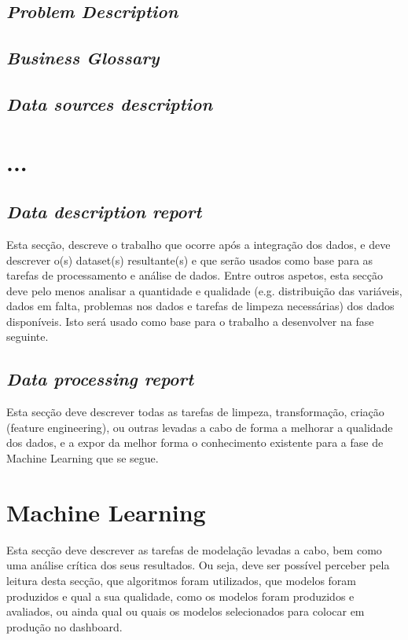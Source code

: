 \documentclass[11pt,a4paper]{report}
\begin{document}
\section{\textit{Problem Description}}

\section{\textit{Business Glossary}}

\section{\textit{Data sources description}}

\chapter{...}

\section{\textit{Data description report}}

Esta secção, descreve o trabalho que ocorre após a integração dos
dados, e deve descrever o(s) dataset(s) resultante(s) e que serão usados como base para as
tarefas de processamento e análise de dados. Entre outros aspetos, esta secção deve pelo
menos analisar a quantidade e qualidade (e.g. distribuição das variáveis, dados em falta,
problemas nos dados e tarefas de limpeza necessárias) dos dados disponíveis. Isto será
usado como base para o trabalho a desenvolver na fase seguinte.

\section{\textit{Data processing report}}

Esta secção deve descrever todas as tarefas de limpeza,
transformação, criação (feature engineering), ou outras levadas a cabo de forma a melhorar
a qualidade dos dados, e a expor da melhor forma o conhecimento existente para a fase de
Machine Learning que se segue.

\chapter{Machine Learning}

Esta secção deve descrever as tarefas de modelação levadas a cabo,
bem como uma análise crítica dos seus resultados. Ou seja, deve ser possível perceber pela
leitura desta secção, que algoritmos foram utilizados, que modelos foram produzidos e qual
a sua qualidade, como os modelos foram produzidos e avaliados, ou ainda qual ou quais os
modelos selecionados para colocar em produção no dashboard.
\end{document}

